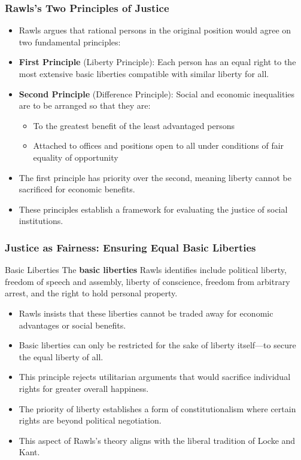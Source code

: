 \documentclass[aspectratio=169]{beamer}
\begin{document}
\begin{frame}
  \frametitle{Rawls's Two Principles of Justice}
  
  \begin{itemize}
    \item Rawls argues that rational persons in the original position would agree on two fundamental principles:
    \item \textbf{First Principle} (Liberty Principle): Each person has an equal right to the most extensive basic liberties compatible with similar liberty for all.
    \item \textbf{Second Principle} (Difference Principle): Social and economic inequalities are to be arranged so that they are:
      \begin{itemize}
        \item To the greatest benefit of the least advantaged persons
        \item Attached to offices and positions open to all under conditions of fair equality of opportunity
      \end{itemize}
    \item The first principle has priority over the second, meaning liberty cannot be sacrificed for economic benefits.
    \item These principles establish a framework for evaluating the justice of social institutions.
  \end{itemize}
\end{frame}

\begin{frame}
  \frametitle{Justice as Fairness: Ensuring Equal Basic Liberties}
  
  \begin{block}{Basic Liberties}
    The \textbf{basic liberties} Rawls identifies include political liberty, freedom of speech and assembly, liberty of conscience, freedom from arbitrary arrest, and the right to hold personal property.
  \end{block}
  
  \begin{itemize}
    \item Rawls insists that these liberties cannot be traded away for economic advantages or social benefits.
    \item Basic liberties can only be restricted for the sake of liberty itself—to secure the equal liberty of all.
    \item This principle rejects utilitarian arguments that would sacrifice individual rights for greater overall happiness.
    \item The priority of liberty establishes a form of constitutionalism where certain rights are beyond political negotiation.
    \item This aspect of Rawls's theory aligns with the liberal tradition of Locke and Kant.
  \end{itemize}
\end{frame}
\end{document}
